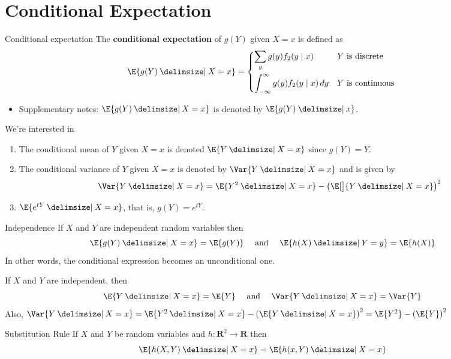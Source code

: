 \section{Conditional Expectation}
\begin{Definition}{Conditional expectation}{}
    The \textbf{conditional expectation} of $ g(Y) $
    given $ X=x $ is defined as
    \[ \E{g(Y)\given X=x}=
        \begin{dcases*}
            \sum_{y}g(y)f_2(y\mid x)                        & $Y$ is discrete   \\
            \int_{-\infty}^{\infty} g(y)f_2(y\mid x)\, d{y} & $Y$ is continuous
        \end{dcases*} \]
\end{Definition}
\begin{Remark}{}{}
    \begin{itemize}
        \item Supplementary notes: $ \E{g(Y)\given X=x} $
              is denoted by $ \E{g(Y)\given x} $.
    \end{itemize}
    We're interested in
    \begin{enumerate}
        \item The conditional mean of $ Y $ given $ X=x $
              is denoted $ \E{Y\given X=x} $ since $ g(Y)=Y $.
        \item The conditional variance of $ Y $ given $ X=x $
              is denoted by $ \Var{Y\given X=x} $ and is given by
              \[ \Var{Y\given X=x}=\E{Y^2\given X=x}-\left( \E[\big]{Y\given X=x} \right)^2 \]
        \item $ \E{e^{tY}\given X=x} $, that is, $ g(Y)=e^{tY} $.
    \end{enumerate}
\end{Remark}
\begin{Theorem}{Independence}{}
    If $ X $ and $ Y $ are independent random variables then
    \[ \E{g(Y)\given X=x}=\E{g(Y)}\quad\text{ and }\quad\E{h(X)\given Y=y}=\E{h(X)} \]
    In other words, the conditional expression becomes an unconditional one.
\end{Theorem}
\begin{Example}{}{}
    If $ X $ and $ Y $ are independent, then
    \[ \E{Y\given X=x}=\E{Y}\quad\text{ and }\quad \Var{Y\given X=x}=\Var{Y} \]
    Also, $ \Var{Y\given X=x}=\E{Y^2\given X=x}-\left( \E{Y\given X=x} \right)^2=
        \E{Y^2}-\left( \E{Y} \right)^2 $
\end{Example}
\begin{Theorem}{Substitution Rule}{}
    If $ X $ and $ Y $
    be random variables and $ h:\mathbf{R}^2\to \mathbf{R} $ then
    \[ \E{h(X,Y)\given X=x}=\E{h(x,Y)\given X=x} \]
\end{Theorem}
